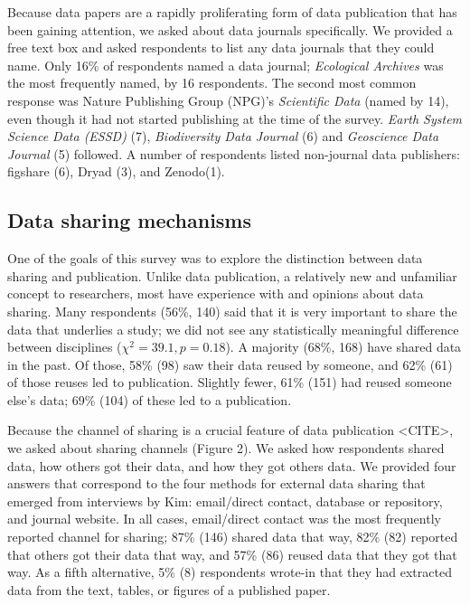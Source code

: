 \documentclass[10pt]{article}
\begin{document}
Because data papers are a rapidly proliferating form of data publication that has been gaining attention, we asked about data journals specifically.
We provided a free text box and asked respondents to list any data journals that they could name.
Only 16\% of respondents named a data journal; \emph{Ecological Archives} was the most frequently named, by 16 respondents. 
The second most common response was Nature Publishing Group (NPG)'s \emph{Scientific Data} (named by 14), even though it had not started publishing at the time of the survey.
\emph{Earth System Science Data (ESSD)} (7), \emph{Biodiversity Data Journal} (6) and \emph{Geoscience Data Journal} (5) followed.
A number of respondents listed non-journal data publishers: figshare (6), Dryad (3), and Zenodo(1).

\subsection*{Data sharing mechanisms}

One of the goals of this survey was to explore the distinction between data sharing and publication.
Unlike data publication, a relatively new and unfamiliar concept to researchers, most have experience with and opinions about data sharing.
Many respondents (56\%, 140) said that it is very important to share the data that underlies a study; we did not see any statistically meaningful difference between disciplines ($\chi^{2}= 39.1, p= 0.18$). %
A majority (68\%, 168) have shared data in the past.
Of those, 58\% (98) saw their data reused by someone, and 62\% (61) of those reuses led to publication.
Slightly fewer, 61\% (151) had reused someone else's data; 69\% (104) of these led to a publication.

Because the channel of sharing is a crucial feature of data publication <CITE>, we asked about sharing channels (Figure 2).
We asked how respondents shared data, how others got their data, and how they got others data.
We provided four answers that correspond to the four methods for external data sharing that emerged from interviews by Kim\cite{kim_institutional_2012}: email/direct contact, database or repository, and journal website.
In all cases, email/direct contact was the most frequently reported channel for sharing; 87\% (146) shared data that way, 82\% (82) reported that others got their data that way, and 57\% (86) reused data that they got that way.
As a fifth alternative, 5\% (8) respondents wrote-in that they had extracted data from the text, tables, or figures of a published paper.
\end{document}
